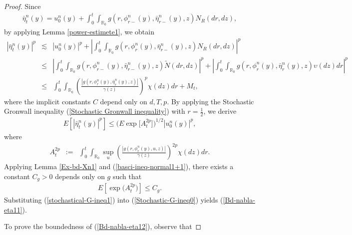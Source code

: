 \documentclass[12pt,oneside, reqno]{amsart}
\newcommand{\be}{\begin{eqnarray}}
\newcommand{\ee}{\end{eqnarray}}
\newcommand{\ce}{\begin{eqnarray*}}
\newcommand{\de}{\end{eqnarray*}}
\def\no{\nonumber}
\def\mR{{\mathbb R}}
\def\leq{\leqslant}
\numberwithin{equation}{section}
\begin{document}
\begin{proof}
Since 
	\ce 
\bar\eta_t^n(y)=u_0^n(y)+\int_0^t\int_{\mR_0}  g(r,\phi_{r-}^n(y),\bar\eta_{r-}^n(y),z) N_R(dr,dz),
	\de 
by applying Lemma \ref{power-estimete1}, we obtain
\be\label{basic-ineq-1} 
|\bar\eta_t^n(y)|^p&\lesssim &|u_0^n(y)|^p+|\int_0^t\int_{\mR_0}  g(r,\phi_{r}^n(y),\bar\eta_{r-}^n(y),z) N_R(dr,dz)|^p\no\\
&\leq& |\int_0^t\int_{\mR_0}  g(r,\phi_{r-}^n(y),\bar\eta_{r-}^n(y),z) \tilde{N}(dr,dz)|^p+|\int_0^t\int_{\mR_0}  g(r,\phi_{r}^n(y),\bar\eta_{r}^n(y),z) \upsilon(dz)dr|^p\no\\
&\leq&\int_0^t\int_{\mR_0}  \left(\frac{|g(r,\phi_{r}^n(y),\bar\eta_{r}^n(y),z)|}{\gamma(z)}\right)^p \chi(dz)dr+M_t,
\ee 
where the implicit constants $C$  depend only on $d,T,p$. By applying the Stochastic Gronwall inequality (\ref{Stochastic Gronwall inequality}) with $r=\frac{1}{2}$, we derive
	\be\label{Stochastic-G-ineq0} 
	E[| \bar\eta_t^n(y)|^{p}]\leq \big(E \exp\big[A_t^{2p}\big]\big)^{1/2}|u_0^n(y)|^{p},
	\ee 
	where 
	\ce 
	A_t^{2p}&:=&\int_0^t\int_{\mR_0}\sup_u\left(\frac{| g(r,\phi_{r}^n(y),u,z)|}{\gamma(z)}\right)^{2p} \chi(dz)dr.
	\de 
Applying Lemma  \ref{Ex-bd-Xn1} and (\ref{basci-ineq-normal1+1}), there exists a constant $C_g>0$ depends only on  $g$ such that 
	\be\label{stochastical-G-ineq1} 
	E[\exp\big(A_t^{2p}\big)]\leq C_g.
	\ee 
Substituting (\ref{stochastical-G-ineq1})  into	(\ref{Stochastic-G-ineq0}) yields  (\ref{Bd-nabla-eta11}).
	
To prove the boundedness of  (\ref{Bd-nabla-eta12}), observe that 


\end{proof}
\end{document}
